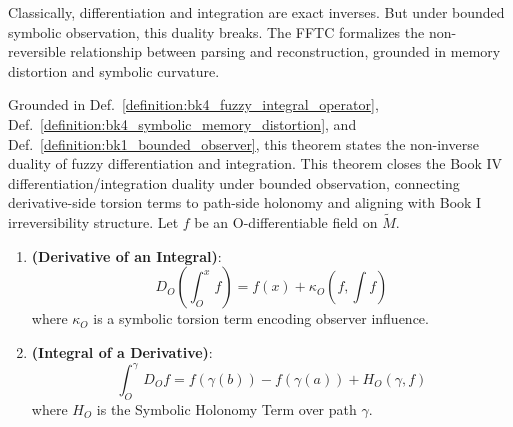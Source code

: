 Classically, differentiation and integration are exact inverses. But under bounded symbolic observation, this duality breaks. The FFTC formalizes the non-reversible relationship between parsing and reconstruction, grounded in memory distortion and symbolic curvature.

\begin{theorem}
\label{theorem:bk4_fuzzy_fundamental}
Grounded in Def.~\ref{definition:bk4_fuzzy_integral_operator}, Def.~\ref{definition:bk4_symbolic_memory_distortion}, and Def.~\ref{definition:bk1_bounded_observer}, this theorem states the non-inverse duality of fuzzy differentiation and integration.
This theorem closes the Book IV differentiation/integration duality under bounded observation, connecting derivative-side torsion terms to path-side holonomy and aligning with Book I irreversibility structure.
Let $f$ be an O-differentiable field on $\tilde{M}$.
\begin{enumerate}
    \item \textbf{(Derivative of an Integral)}:
    \[
    D_O \left( \int_O^x f \right) = f(x) + \kappa_O\left(f, \int f\right)
    \]
    where $\kappa_O$ is a symbolic torsion term encoding observer influence.
    
    \item \textbf{(Integral of a Derivative)}:
    \[
    \int_O^\gamma D_O f = f(\gamma(b)) - f(\gamma(a)) + H_O(\gamma, f)
    \]
    where $H_O$ is the Symbolic Holonomy Term over path $\gamma$.
\end{enumerate}
\end{theorem}

